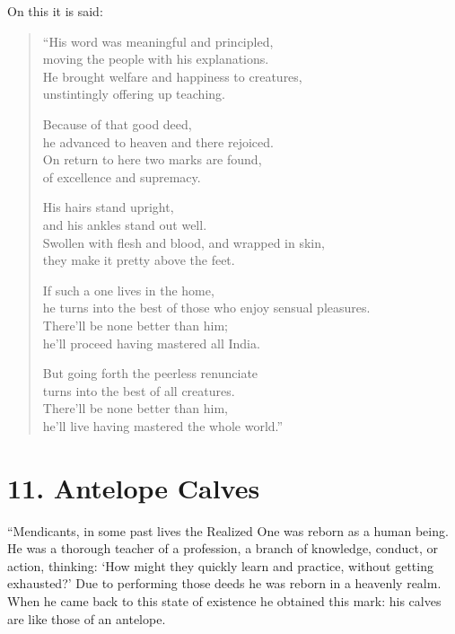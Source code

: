 \documentclass[12pt,openany]{book}%
\begin{document}
On this it is said: 

\begin{verse}%
“His word was meaningful and principled, \\
moving the people with his explanations. \\
He brought welfare and happiness to creatures, \\
unstintingly offering up teaching. 

Because of that good deed, \\
he advanced to heaven and there rejoiced. \\
On return to here two marks are found, \\
of excellence and supremacy. 

His hairs stand upright, \\
and his ankles stand out well. \\
Swollen with flesh and blood, and wrapped in skin, \\
they make it pretty above the feet. 

If such a one lives in the home, \\
he turns into the best of those who enjoy sensual pleasures. \\
There’ll be none better than him; \\
he’ll proceed having mastered all India. 

But going forth the peerless renunciate \\
turns into the best of all creatures. \\
There’ll be none better than him, \\
he’ll live having mastered the whole world.” 

%
\end{verse}

\section*{11. Antelope Calves }

“Mendicants, in some past lives the Realized One was reborn as a human being. He was a thorough teacher of a profession, a branch of knowledge, conduct, or action, thinking: ‘How might they quickly learn and practice, without getting exhausted?’ Due to performing those deeds he was reborn in a heavenly realm. When he came back to this state of existence he obtained this mark: his calves are like those of an antelope. 
\end{document}
